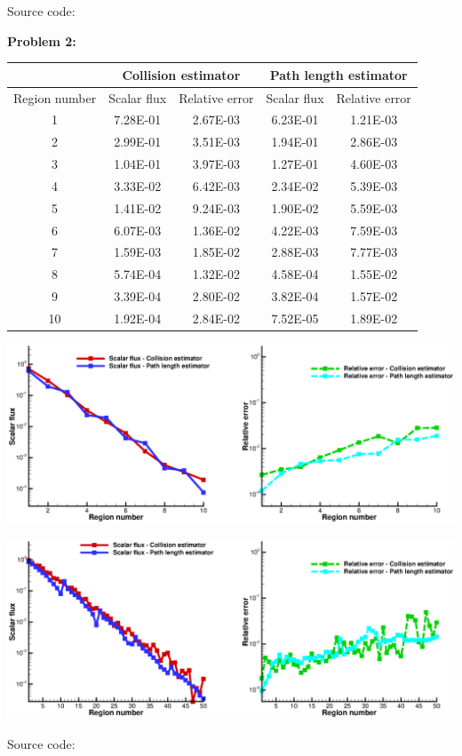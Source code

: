 \documentclass[12pt]{article}
\begin{document}
Source code:


\textbf{Problem 2:}

\begin{center}
  \begin{tabular}{|c|c|c|c|c|}
    \hline
    & \multicolumn{2}{c|}{\textbf{Collision estimator}}
    & \multicolumn{2}{c|}{\textbf{Path length estimator}}\\
     \cline{2-5}
    \hline
    Region number & Scalar flux & Relative error & Scalar flux &
    Relative error\\
    \hline
    1	 & 7.28E-01 & 2.67E-03 & 6.23E-01 & 1.21E-03 \\
    2	 & 2.99E-01 & 3.51E-03 & 1.94E-01 & 2.86E-03 \\
    3	 & 1.04E-01 & 3.97E-03 & 1.27E-01 & 4.60E-03 \\
    4	 & 3.33E-02 & 6.42E-03 & 2.34E-02 & 5.39E-03 \\
    5	 & 1.41E-02 & 9.24E-03 & 1.90E-02 & 5.59E-03 \\
    6	 & 6.07E-03 & 1.36E-02 & 4.22E-03 & 7.59E-03 \\
    7	 & 1.59E-03 & 1.85E-02 & 2.88E-03 & 7.77E-03 \\
    8	 & 5.74E-04 & 1.32E-02 & 4.58E-04 & 1.55E-02 \\
    9	 & 3.39E-04 & 2.80E-02 & 3.82E-04 & 1.57E-02 \\
    10 & 1.92E-04 & 2.84E-02 & 7.52E-05 & 1.89E-02 \\
    \hline
  \end{tabular}
  \includegraphics[width=1.0\textwidth]{problem2_10.eps}
\end{center}

\begin{center}
  \includegraphics[width=1.0\textwidth]{problem2_50.eps}
\end{center}

Source code:



% 
% 
\end{document}
